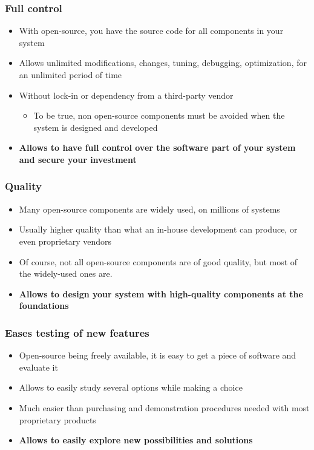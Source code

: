 \begin{frame}
  \frametitle{Full control}
  \begin{itemize}
  \item With open-source, you have the source code for all components
    in your system
  \item Allows unlimited modifications, changes, tuning, debugging,
    optimization, for an unlimited period of time
  \item Without lock-in or dependency from a third-party vendor
    \begin{itemize}
    \item To be true, non open-source components must be avoided when
      the system is designed and developed
    \end{itemize}
  \item {\bf Allows to have full control over the software part of
      your system and secure your investment}
  \end{itemize}
\end{frame}

\begin{frame}
  \frametitle{Quality}
  \begin{itemize}
  \item Many open-source components are widely used, on millions of
    systems
  \item Usually higher quality than what an in-house development can
    produce, or even proprietary vendors
  \item Of course, not all open-source components are of good quality,
    but most of the widely-used ones are.
  \item {\bf Allows to design your system with high-quality components
      at the foundations}
\end{itemize}
\end{frame}

\begin{frame}
  \frametitle{Eases testing of new features}
  \begin{itemize}
  \item Open-source being freely available, it is easy to get a piece
    of software and evaluate it
  \item Allows to easily study several options while making a choice
  \item Much easier than purchasing and demonstration procedures
    needed with most proprietary products
  \item {\bf Allows to easily explore new possibilities and solutions}
  \end{itemize}
\end{frame}

